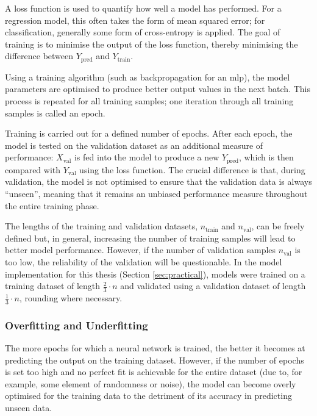 A loss function is used to quantify how well a model has performed. For a regression model, this often takes the form of mean squared error; for classification, generally some form of cross-entropy is applied. The goal of training is to minimise the output of the loss function, thereby minimising the difference between \(Y_{\text{pred}}\) and \(Y_{\text{train}}\).

Using a training algorithm (such as backpropagation for an \ac{mlp}), the model parameters are optimised to produce better output values in the next batch. This process is repeated for all training samples; one iteration through all training samples is called an epoch. \cite[]{kirk_thoughtful_2017}

Training is carried out for a defined number of epochs. After each epoch, the model is tested on the validation dataset as an additional measure of performance: \(X_{\text{val}}\) is fed into the model to produce a new \(Y_{\text{pred}}\), which is then compared with \(Y_{\text{val}}\) using the loss function. The crucial difference is that, during validation, the model is not optimised to ensure that the validation data is always ``unseen'', meaning that it remains an unbiased performance measure throughout the entire training phase.

The lengths of the training and validation datasets, \(n_{\text{train}}\) and \(n_{\text{val}}\), can be freely defined but, in general, increasing the number of training samples will lead to better model performance. However, if the number of validation samples \(n_{\text{val}}\) is too low, the reliability of the validation will be questionable. In the model implementation for this thesis (Section \ref{sec:practical}), models were trained on a training dataset of length \(\frac{2}{3} \cdot n\) and validated using a validation dataset of length \(\frac{1}{3} \cdot n\), rounding where necessary.

\subsubsection{Overfitting and Underfitting}
The more epochs for which a neural network is trained, the better it becomes at predicting the output on the training dataset. However, if the number of epochs is set too high and no perfect fit is achievable for the entire dataset (due to, for example, some element of randomness or noise), the model can become overly optimised for the training data to the detriment of its accuracy in predicting unseen data.

